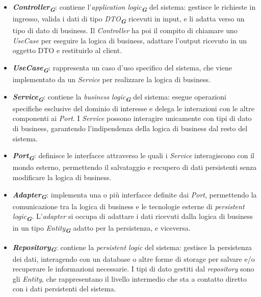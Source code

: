 \begin{itemize}
    \item \textbf{\emph{Controller}}\textsubscript{\textbf{\textit{G}}}: contiene l'\emph{application logic}\textsubscript{\textbf{\textit{G}}} del sistema: gestisce le richieste in ingresso, valida i dati di tipo \emph{DTO}\textsubscript{\textbf{\textit{G}}} ricevuti in input, e li adatta verso un tipo di dato di business. Il \emph{Controller} ha poi il compito di chiamare uno \emph{UseCase} per eseguire la logica di business, adattare l'output ricevuto in un oggetto DTO e restituirlo al client.
    \item \textbf{\emph{UseCase}}\textsubscript{\textbf{\textit{G}}}: rappresenta un caso d'uso specifico del sistema, che viene implementato da un \emph{Service} per realizzare la logica di business.
    \item \textbf{\emph{Service}}\textsubscript{\textbf{\textit{G}}}: contiene la \emph{business logic}\textsubscript{\textbf{\textit{G}}} del sistema: esegue operazioni specifiche esclusive del dominio di interesse e delega le interazioni con le altre componenti ai \emph{Port}. I \emph{Service} possono interagire unicamente con tipi di dato di business, garantendo l'indipendenza della logica di business dal resto del sistema.
    \item \textbf{\emph{Port}}\textsubscript{\textbf{\textit{G}}}: definisce le interfacce attraverso le quali i \emph{Service} interagiscono con il mondo esterno, permettendo il salvataggio e recupero di dati persistenti senza modificare la logica di business.
    \item \textbf{\emph{Adapter}}\textsubscript{\textbf{\textit{G}}}: implementa una o più interfacce definite dai \emph{Port}, permettendo la comunicazione tra la logica di business e le tecnologie esterne di \emph{persistent logic}\textsubscript{\textbf{\textit{G}}}. L'\emph{adapter} si occupa di adattare i dati ricevuti dalla logica di business in un tipo \emph{Entity}\textsubscript{\textbf{\textit{G}}} adatto per la persistenza, e viceversa.
    \item \textbf{\emph{Repository}}\textsubscript{\textbf{\textit{G}}}: contiene la \emph{persistent logic} del sistema: gestisce la persistenza dei dati, interagendo con un database o altre forme di storage per salvare e/o recuperare le informazioni necessarie. I tipi di dato gestiti dal \emph{repository} sono gli \emph{Entity}, che rappresentano il livello intermedio che sta a contatto diretto con i dati persistenti del sistema.
\end{itemize}

